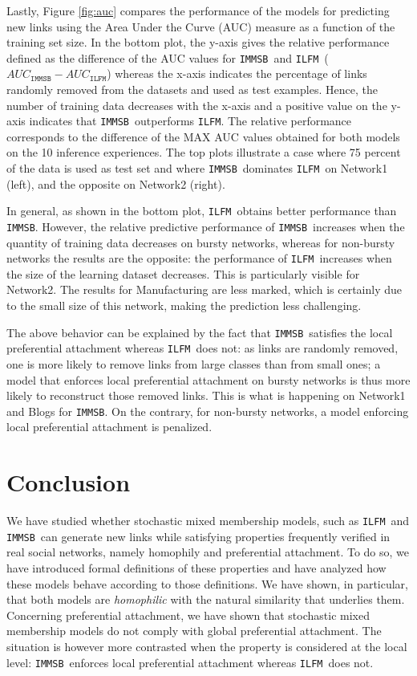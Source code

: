 \documentclass[9pt,twocolumn,twoside]{pnas-new}
\newcommand{\ifm}{\texttt{ILFM}}
\newcommand{\imb}{\texttt{IMMSB}}
\begin{document}
Lastly, Figure \ref{fig:auc} compares the performance of the models for predicting new links using the Area Under the Curve (AUC) measure as a function of the training set size. In the bottom plot, the y-axis gives the relative performance defined as the difference of the AUC values for \imb\ and \ifm\ ($AUC_{\imb} - AUC_{\ifm}$) whereas the x-axis indicates the percentage of links randomly removed from the datasets and used as test examples. Hence, the number of training data decreases with the x-axis and a positive value on the y-axis indicates that \imb\ outperforms \ifm.  The relative performance corresponds to the difference of the MAX AUC values obtained for both models on the 10 inference experiences. The top plots illustrate a case where 75 percent of the data is used as test set and where \imb\ dominates \ifm\ on Network1 (left), and the opposite on Network2 (right).

In general, as shown in the bottom plot, \ifm\ obtains better performance than \imb. However, the relative predictive performance of \imb\  increases  when the quantity of training data decreases on bursty networks, whereas for non-bursty networks the results are the opposite: the performance of \ifm\ increases when the size of the learning dataset decreases. This is particularly visible for Network2. The results for Manufacturing are less marked, which is certainly due to the small size of this network, making the prediction less challenging.

The above behavior can be explained by the fact that \imb\ satisfies the local preferential attachment whereas \ifm\ does not: as links are randomly removed, one is more likely to remove links from large classes than from small ones; a model that enforces local preferential attachment on bursty networks is thus more likely to reconstruct those removed links. This is what is happening on Network1 and Blogs for \imb. On the contrary, for non-bursty networks, a model enforcing local preferential attachment is penalized.

\section{Conclusion}

We have studied whether stochastic mixed membership models, such as \ifm\ and \imb\, can generate new links while satisfying properties frequently verified in real  social networks, namely homophily and preferential attachment. To do so, we have introduced formal definitions of these properties and have analyzed how these models behave according to those definitions. We have shown, in particular, that both models are \textit{homophilic} with the natural similarity that underlies them. Concerning preferential attachment, we have shown that stochastic mixed membership models do not comply with global preferential attachment. The situation is however more contrasted when the property is considered at the local level: \imb\ enforces local preferential attachment whereas \ifm\ does not.
\end{document}
